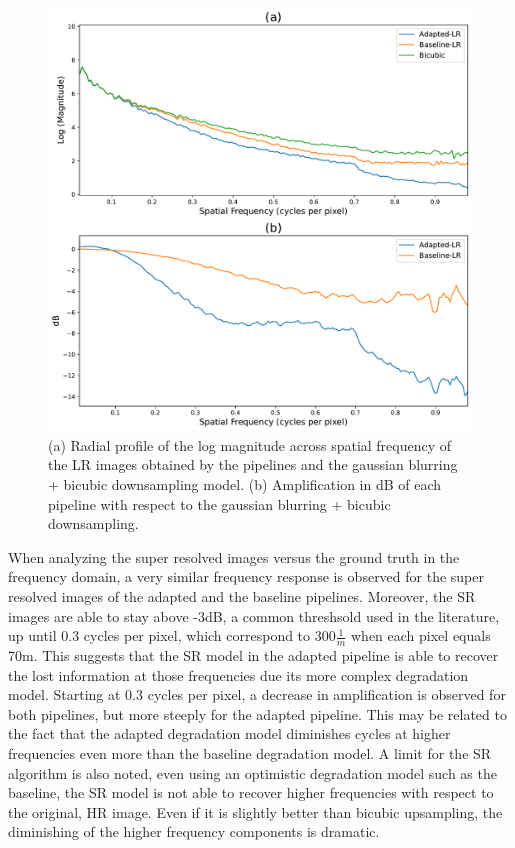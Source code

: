         \begin{figure}[H]
            \centering
            \includegraphics[scale=0.45]{Includes/5-lr-images-fft-comparison.pdf}
            \caption{(a) Radial profile of the log magnitude across spatial frequency of the LR images obtained by the pipelines and the gaussian blurring + bicubic downsampling model.
                     (b) Amplification in dB of each pipeline with respect to the gaussian blurring + bicubic downsampling.}
            \label{fig:5-lr-images-fft-comparison.pdf}
        \end{figure}

        When analyzing the super resolved images versus the ground truth in the frequency domain, a very similar frequency response is observed for the super resolved images of the adapted and the baseline pipelines.
        Moreover, the SR images are able to stay above -3dB, a common threshsold used in the literature, up until 0.3 cycles per pixel, which correspond to 300$\frac{1}{m}$ when each pixel equals 70m.
        This suggests that the SR model in the adapted pipeline is able to recover the lost information at those frequencies due its more complex degradation model.
        Starting at 0.3 cycles per pixel, a decrease in amplification is observed for both pipelines, but more steeply for the adapted pipeline.
        This may be related to the fact that the adapted degradation model diminishes cycles at higher frequencies even more than the baseline degradation model. 
        A limit for the SR algorithm is also noted, even using an optimistic degradation model such as the baseline, the SR model is not able to recover higher frequencies with respect to the original, HR image.
        Even if it is slightly better than bicubic upsampling, the diminishing of the higher frequency components is dramatic.

